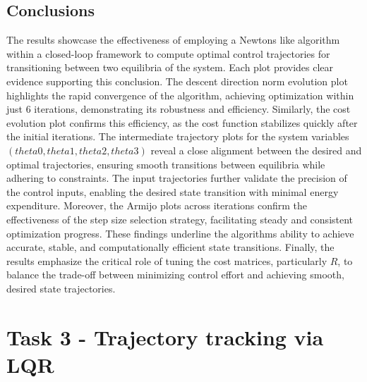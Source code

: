 \documentclass[a4paper,11pt,oneside]{book}
\begin{document}
\section{Conclusions}
\begin{justify}
    {The results showcase the effectiveness of employing a Newton\textquotesingle s like algorithm within a closed-loop framework to compute optimal control trajectories for transitioning between two equilibria of the system. Each plot provides clear evidence supporting this conclusion. The descent direction norm evolution plot highlights the rapid convergence of the algorithm, achieving optimization within just 6 iterations, demonstrating its robustness and efficiency. Similarly, the cost evolution plot confirms this efficiency, as the cost function stabilizes quickly after the initial iterations. The intermediate trajectory plots for the system variables $(theta0, theta1, theta2, theta3)$ reveal a close alignment between the desired and optimal trajectories, ensuring smooth transitions between equilibria while adhering to constraints. The input trajectories further validate the precision of the control inputs, enabling the desired state transition with minimal energy expenditure. Moreover, the Armijo plots across iterations confirm the effectiveness of the step size selection strategy, facilitating steady and consistent optimization progress. These findings underline the algorithm\textquotesingle s ability to achieve accurate, stable, and computationally efficient state transitions. Finally, the results emphasize the critical role of tuning the cost matrices, particularly $R$, to balance the trade-off between minimizing control effort and achieving smooth, desired state trajectories.}
\end{justify}

\chapter{Task 3 - Trajectory tracking via LQR}
\end{document}
